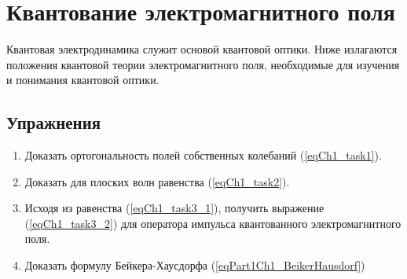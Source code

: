 \chapter{Квантование электромагнитного поля} 
\label{chQuantel}

Квантовая электродинамика служит основой квантовой оптики. Ниже
излагаются положения квантовой теории электромагнитного поля,
необходимые для изучения и понимания квантовой оптики.















\section{Упражнения}
\begin{enumerate}
\item Доказать ортогональность полей собственных колебаний
  (\ref{eqCh1_task1}).  
\item Доказать для плоских волн равенства (\ref{eqCh1_task2}).
\item Исходя из равенства (\ref{eqCh1_task3_1}), получить выражение
  (\ref{eqCh1_task3_2}) для оператора импульса квантованного
  электромагнитного поля. 
\item Доказать формулу Бейкера-Хаусдорфа (\ref{eqPart1Ch1_BeikerHausdorf})
\end{enumerate}

